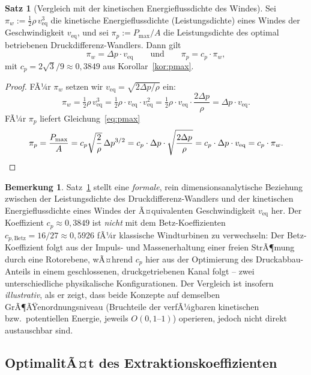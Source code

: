 ﻿\documentclass[a4paper,12pt]{article}
\theoremstyle{definition}
\newtheorem{satz}{Satz}
\newtheorem{bemerkung}{Bemerkung}
\begin{document}
\begin{satz}[Vergleich mit der kinetischen Energieflussdichte des Windes]
	\label{satz:vergleich_wind}
	Sei $\pi_w := \tfrac{1}{2}\rho\, v_{\mathrm{eq}}^3$ die kinetische
	Energieflussdichte (Leistungsdichte) eines Windes der Geschwindigkeit
	$v_{\mathrm{eq}}$, und sei $\pi_p := P_{\max}/A$ die
	Leistungsdichte des optimal betriebenen Druckdifferenz-Wandlers.
	Dann gilt
	\[
		\pi_w = \Delta p \cdot v_{\mathrm{eq}}
		\qquad\text{und}\qquad
		\pi_p = c_p \cdot \pi_w,
	\]
	mit $c_p = 2\sqrt{3}/9 \approx 0{,}3849$ aus
	Korollar~\ref{kor:pmax}.
\end{satz}

\begin{proof}
	FÃ¼r $\pi_w$ setzen wir $v_{\mathrm{eq}} = \sqrt{2\Delta p/\rho}$ ein:
	\[
		\pi_w = \tfrac{1}{2}\rho\, v_{\mathrm{eq}}^3
		= \tfrac{1}{2}\rho \cdot v_{\mathrm{eq}} \cdot v_{\mathrm{eq}}^2
		= \tfrac{1}{2}\rho \cdot v_{\mathrm{eq}} \cdot \frac{2\Delta p}{\rho}
		= \Delta p \cdot v_{\mathrm{eq}}.
	\]
	FÃ¼r $\pi_p$ liefert Gleichung~\eqref{eq:pmax}
	\[
		\pi_p = \frac{P_{\max}}{A}
		= c_p \sqrt{\frac{2}{\rho}}\, \Delta p^{3/2}
		= c_p \cdot \Delta p \cdot \sqrt{\frac{2\Delta p}{\rho}}
		= c_p \cdot \Delta p \cdot v_{\mathrm{eq}}
		= c_p \cdot \pi_w. \qedhere
	\]
\end{proof}

\begin{bemerkung}
	\label{bem:betz}
	Satz~\ref{satz:vergleich_wind} stellt eine \emph{formale}, rein
	dimensionsanalytische Beziehung zwischen der Leistungsdichte des
	Druckdifferenz-Wandlers und der kinetischen Energieflussdichte eines
	Windes der Ã¤quivalenten Geschwindigkeit $v_{\mathrm{eq}}$ her. Der
	Koeffizient $c_p \approx 0{,}3849$ ist \emph{nicht} mit dem
	Betz-Koeffizienten $c_{p,\mathrm{Betz}} = 16/27 \approx 0{,}5926$ fÃ¼r
	klassische Windturbinen zu verwechseln: Der Betz-Koeffizient folgt
	aus der Impuls- und Massenerhaltung einer freien StrÃ¶mung durch eine
	Rotorebene, wÃ¤hrend $c_p$ hier aus der Optimierung des
	Druckabbau-Anteils in einem geschlossenen, druckgetriebenen Kanal
	folgt -- zwei unterschiedliche physikalische Konfigurationen. Der
	Vergleich ist insofern \emph{illustrativ}, als er zeigt, dass beide
	Konzepte auf demselben GrÃ¶ÃŸenordnungsniveau (Bruchteile der
	verfÃ¼gbaren kinetischen bzw.\ potentiellen Energie, jeweils
	$O(0{,}1\text{--}1)$) operieren, jedoch nicht direkt austauschbar
	sind.
\end{bemerkung}

\subsection{OptimalitÃ¤t des Extraktionskoeffizienten}
\end{document}
